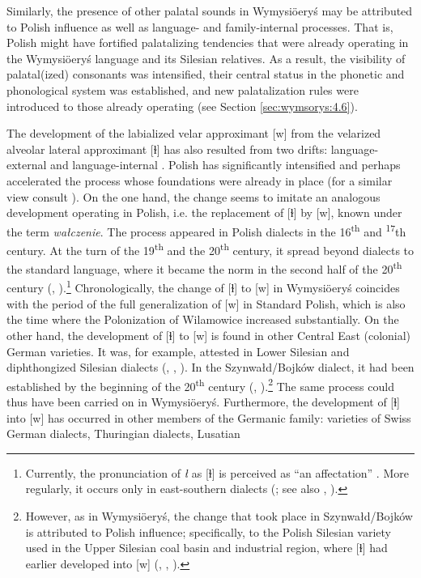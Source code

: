 \documentclass[output=paper,hidelinks]{langscibook}
\begin{document}
Similarly, the presence of other palatal sounds in Wymysiöeryś may be attributed to Polish influence as well as language- and family-internal processes. That is, Polish might have fortified palatalizing tendencies that were already operating in the Wymysiöeryś language and its Silesian relatives. As a result, the visibility of palatal(ized) consonants was intensified, their central status in the phonetic and phonological system was established, and new palatalization rules were introduced to those already operating (see Section \ref{sec:wymsorys:4.6}).

The development of the labialized velar approximant [w] from the velarized alveolar lateral approximant [ɫ] has also resulted from two drifts: language-ex\-ter\-nal and language-internal \citep{andrason_polish_2014, andrason_vilamovicean_2015, Andrason2021, zak2019pewnym}. Polish has significantly intensified and perhaps accelerated the process whose foundations were already in place (for a similar view consult \citealt[234]{selmer_velarization_1933}). On the one hand, the change seems to imitate an analogous development operating in Polish, i.e. the replacement of [ɫ] by [w], known under the term \textit{wałczenie}. The process appeared in Polish dialects in the 16\textsuperscript{th} and \textsuperscript{17}th century. At the turn of the 19\textsuperscript{th} and the 20\textsuperscript{th} century, it spread beyond dialects to the standard language, where it became the norm in the second half of the 20\textsuperscript{th} century (\citealt[372]{urbanczyk_encyklopedia_1991}, \citealt[28]{gussmann_phonology_2007}).\footnote{Currently, the pronunciation of \textit{ł} as [ɫ] is perceived as ``an affectation'' \citep[28]{gussmann_phonology_2007}. More regularly, it occurs only in east-southern dialects (\citealt[146]{dubisz_dialekty_1995}; see also \citealt[46--47]{nitsch_dialekty_1957}, \citealt{zak2019pewnym}).} Chronologically, the change of [ɫ] to [w] in Wymysiöeryś coincides with the period of the full generalization of [w] in Standard Polish, which is also the time where the Polonization of Wilamowice increased substantially. On the other hand, the development of [ɫ] to [w] is found in other Central East (colonial) German varieties. It was, for example, attested in Lower Silesian and diphthongized Silesian dialects (\citealt[35]{von_unwerth_schlesische_1908}, \citealt[105]{gusinde_vergessene_1911}, \citealt[233--234]{selmer_velarization_1933}). In the Szynwałd/Bojków dialect, it had been established by the beginning of the 20\textsuperscript{th} century (\citealt[104--105]{gusinde_vergessene_1911}, \citealt[125, 161--162]{kleczkowski_dialekt_1920}).\footnote{However, as in Wymysiöeryś, the change that took place in Szynwałd/Bojków is attributed to Polish influence; specifically, to the Polish Silesian variety used in the Upper Silesian coal basin and industrial region, where [ɫ] had earlier developed into [w] (\citealt[156]{nitsch_dialekty_1909}, \citealt[104--105]{gusinde_vergessene_1911}, \citealt[126]{kleczkowski_dialekt_1920}).} The same process could thus have been carried on in Wymysiöeryś. Furthermore, the development of [ɫ] into [w] has occurred in other members of the Germanic family: varieties of Swiss German dialects, Thuringian dialects, Lusatian 
\end{document}
